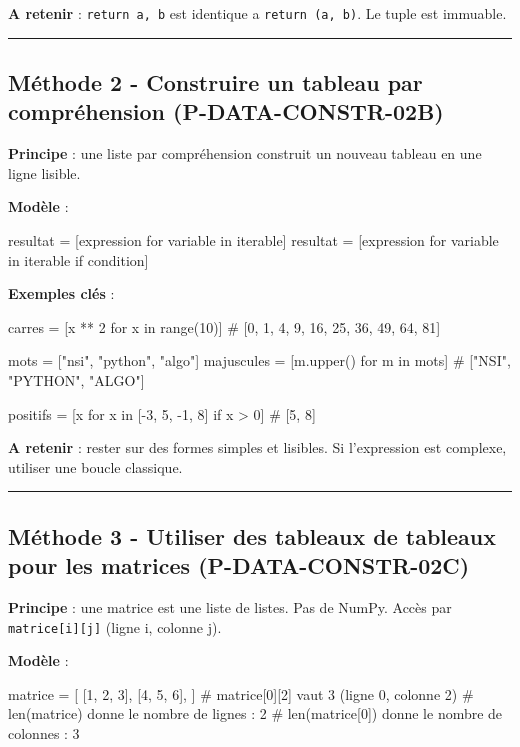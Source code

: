 \textbf{A retenir} : \texttt{return\ a,\ b} est identique a
\texttt{return\ (a,\ b)}. Le tuple est immuable.

\begin{center}\rule{0.5\linewidth}{0.5pt}\end{center}

\subsection{Méthode 2 - Construire un tableau par compréhension (P-DATA-CONSTR-02B)}

\textbf{Principe} : une liste par compréhension construit un nouveau
tableau en une ligne lisible.

\textbf{Modèle} :

\begin{python}
resultat = [expression for variable in iterable]
resultat = [expression for variable in iterable if condition]
\end{python}

\textbf{Exemples clés} :

\begin{python}
carres = [x ** 2 for x in range(10)]
# [0, 1, 4, 9, 16, 25, 36, 49, 64, 81]

mots = ["nsi", "python", "algo"]
majuscules = [m.upper() for m in mots]
# ["NSI", "PYTHON", "ALGO"]

positifs = [x for x in [-3, 5, -1, 8] if x > 0]
# [5, 8]
\end{python}

\textbf{A retenir} : rester sur des formes simples et lisibles. Si
l'expression est complexe, utiliser une boucle classique.

\begin{center}\rule{0.5\linewidth}{0.5pt}\end{center}

\subsection{Méthode 3 - Utiliser des tableaux de tableaux pour les matrices (P-DATA-CONSTR-02C)}

\textbf{Principe} : une matrice est une liste de listes. Pas de NumPy.
Accès par \texttt{matrice{[}i{]}{[}j{]}} (ligne i, colonne j).

\textbf{Modèle} :

\begin{python}
matrice = [
    [1, 2, 3],
    [4, 5, 6],
]
# matrice[0][2] vaut 3 (ligne 0, colonne 2)
# len(matrice) donne le nombre de lignes : 2
# len(matrice[0]) donne le nombre de colonnes : 3
\end{python}

